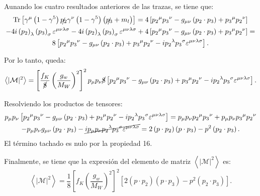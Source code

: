 Aunando los cuatro resultados anteriores de las trazas, se tiene que:
\begin{multline}
\operatorname{Tr} \left[ \gamma^{\mu } \left(1 -\gamma ^{5}\right) \slashed{p_{2}}\gamma^{\nu }\left( 1-\gamma ^{5}\right) \left( \slashed{p_{3}}+m_{l}\right) \right] = 4\left[{p_{2}}^{\mu }{ p_{3}}^{\nu }-g_{\mu \nu }\left( p_{2}\cdot p_{3}\right) +{p_{3}}^{\mu } {p_{2}}^{\nu }\right] \\ -4i\left( p_{2}\right) _{\lambda }\left( p_{3}\right) _{\sigma }\varepsilon ^{\mu \nu \lambda \sigma} -4i\left( p_{2}\right) _{\lambda }\left( p_{3}\right) _{\sigma }\varepsilon ^{\mu \nu \lambda \sigma} + 4\left[{p_{2}}^{\mu }{ p_{3}}^{\nu }-g_{\mu \nu }\left( p_{2}\cdot p_{3}\right) +{p_{3}}^{\mu } {p_{2}}^{\nu }\right] = \\ 8\left[{p_{2}}^{\mu }{ p_{3}}^{\nu }-g_{\mu \nu }\left( p_{2}\cdot p_{3}\right) +{p_{3}}^{\mu } {p_{2}}^{\nu } -i{p_{2}}^{\lambda} {{p_{3}}}^{\sigma} \varepsilon^{  \mu \nu \lambda \sigma} \right] .
\end{multline}

Por lo tanto, queda:
\begin{equation}
\left\langle |\mathcal{M}|^{2}\right\rangle=\left[ \dfrac{f_{K}}{\cancel{8}}\left( \dfrac{g_w}{M_W}\right)^{2}\right]^{2} p_{\mu }p_{\nu}\cancel{8}\left[{p_{2}}^{\mu }{ p_{3}}^{\nu }-g_{\mu \nu }\left( p_{2}\cdot p_{3}\right) +{p_{3}}^{\mu } {p_{2}}^{\nu } -i{p_{2}}^{\lambda} {{p_{3}}}^{\sigma} \varepsilon^{  \mu \nu \lambda \sigma} \right] .
\end{equation}

Resolviendo los productos de tensores:
\begin{multline}
p_{\mu }p_{\nu}\left[{p_{2}}^{\mu }{ p_{3}}^{\nu }-g_{\mu \nu }\left( p_{2}\cdot p_{3}\right) +{p_{3}}^{\mu } {p_{2}}^{\nu } -i{p_{2}}^{\lambda} {{p_{3}}}^{\sigma} \varepsilon^{  \mu \nu \lambda \sigma} \right] =  p_{\mu }p_{\nu}{p_{2}}^{\mu }{ p_{3}}^{\nu } + p_{\mu }p_{\nu}{p_{3}}^{\mu } {p_{2}}^{\nu } \\ - p_{\mu }p_{\nu}g_{\mu \nu }\left( p_{2}\cdot p_{3}\right)- \cancel{i p_{\mu }p_{\nu}{p_{2}}^{\lambda} {{p_{3}}}^{\sigma} \varepsilon^{  \mu \nu \lambda \sigma}} = 2\left( p\cdot p_{2}\right) \left( p\cdot p_{3}\right) -p^{2}\left( p_{2}\cdot p_{3}\right) .
\end{multline}
El término tachado es nulo por la propiedad 16.

Finalmente, se tiene que la expresión del elemento de matriz $\left\langle |\mathcal{M}|^{2}\right\rangle$ es:
\begin{equation}
\left\langle |\mathcal{M}|^{2}\right\rangle=\dfrac{1}{8}\left[ f_{K}\left( \dfrac{g_w}{M_W}\right) ^{2}\right] ^{2}\left[2\left( p\cdot p_{2}\right) \left( p\cdot p_{3}\right) -p^{2}\left( p_{2}\cdot p_{3}\right)\right] .\label{eq:elementomatrix}
\end{equation}

